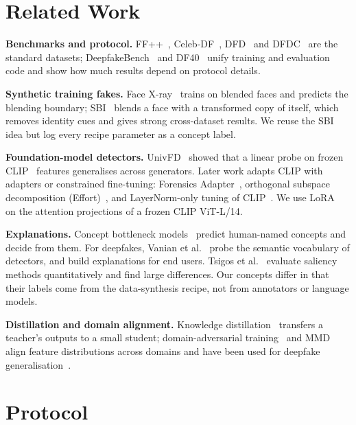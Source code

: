 \documentclass[conference]{IEEEtran}
\begin{document}
\section{Related Work}

\textbf{Benchmarks and protocol.} FF++~\cite{ffpp}, Celeb-DF~\cite{celebdf}, DFD~\cite{dfd} and DFDC~\cite{dfdc}
are the standard datasets; DeepfakeBench~\cite{deepfakebench} and DF40~\cite{df40} unify training and evaluation
code and show how much results depend on protocol details.

\textbf{Synthetic training fakes.} Face X-ray~\cite{facexray} trains on blended faces and predicts the blending
boundary; SBI~\cite{sbi} blends a face with a transformed copy of itself, which removes identity cues and gives
strong cross-dataset results. We reuse the SBI idea but log every recipe parameter as a concept label.

\textbf{Foundation-model detectors.} UnivFD~\cite{univfd} showed that a linear probe on frozen CLIP~\cite{clip}
features generalises across generators. Later work adapts CLIP with adapters or constrained fine-tuning:
Forensics Adapter~\cite{fa}, orthogonal subspace decomposition (Effort)~\cite{effort}, and LayerNorm-only tuning
of CLIP~\cite{lnclip}. We use LoRA~\cite{lora} on the attention projections of a frozen CLIP ViT-L/14.

\textbf{Explanations.} Concept bottleneck models~\cite{cbm} predict human-named concepts and decide from them.
For deepfakes, Vanian et al.~\cite{whyfake} probe the semantic vocabulary of detectors, and
\cite{mansoor,dfp2e,laylens} build explanations for end users. Tsigos et al.~\cite{tsigos} evaluate saliency
methods quantitatively and find large differences. Our concepts differ in that their labels come from the
data-synthesis recipe, not from annotators or language models.

\textbf{Distillation and domain alignment.} Knowledge distillation~\cite{hinton} transfers a teacher's outputs
to a small student; domain-adversarial training~\cite{ganin} and MMD~\cite{mmd} align feature distributions across
domains and have been used for deepfake generalisation~\cite{irm}.

\section{Protocol}\label{sec:protocol}
\end{document}
